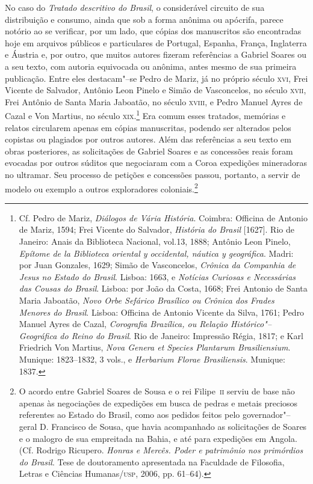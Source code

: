 \documentclass[12pt]{extarticle}
\begin{document}
{No caso do \textit{Tratado descritivo do Brasil}, o considerável
circuito de sua distribuição e consumo, ainda que sob a forma anônima
ou apócrifa, parece notório ao se verificar, por um lado, que cópias
dos manuscritos são encontradas hoje em arquivos públicos e
particulares de Portugal, Espanha, França, Inglaterra e Áustria e, por
outro, que muitos autores fizeram referências a Gabriel Soares ou a seu
texto, com autoria equivocada ou anônima, antes mesmo de sua primeira
publicação. Entre eles destacam"--se Pedro de Mariz, já no próprio século
\textsc{xvi}, Frei Vicente de Salvador, Antônio Leon Pinelo e Simão de
Vasconcelos, no século \textsc{xvii}, Frei Antônio de Santa Maria Jaboatão, no
século \textsc{xviii}, e Pedro Manuel Ayres de Cazal e Von Martius, no século
\textsc{xix}.\footnote{ Cf. Pedro de Mariz, \textit{Diálogos de Vária História}.
Coimbra: Officina de Antonio de Mariz, 1594; Frei Vicente do
Salvador,\textit{ História do Brasil} [1627]. Rio de Janeiro: Anais da
Biblioteca Nacional, vol.13, 1888; Antônio Leon Pinelo, \textit{Epítome
de la Biblioteca oriental y occidental, náutica y geográfica}. Madri:
por Juan Gonzales, 1629;  Simão de Vasconcelos, \textit{Crônica
da Companhia de Jesus no Estado do Brasil}. Lisboa: 1663, e
\textit{Notícias Curiosas e Necessárias das Cousas do Brasil}. Lisboa:
por João da Costa, 1668; Frei Antonio de Santa Maria Jaboatão,
\textit{Novo Orbe Sefárico Brasílico ou Crônica dos Frades Menores do
Brasil}. Lisboa: Officina de Antonio Vicente da Silva, 1761; 
Pedro Manuel Ayres de Cazal, \textit{Corografia Brazílica, ou Relação
Histórico"--Geográfica do Reino do Brasil}. Rio de Janeiro: Impressão
Régia, 1817; e Karl Friedrich Von Martius,
\textit{Nova Genera et Species Plantarum
Brasiliensium}. Munique: 1823--1832, 3 vols., e \textit{Herbarium
Florae Brasiliensis}. Munique: 1837.} Era comum esses tratados,
memórias e relatos circularem apenas em cópias manuscritas, podendo ser
alterados pelos copistas ou plagiados por outros autores. Além das
referências a seu texto em obras posteriores, as solicitações de
Gabriel Soares e as concessões reais foram evocadas por outros súditos
que negociaram com a Coroa expedições mineradoras no ultramar. Seu
processo de petições e concessões passou, portanto, a servir de modelo
ou exemplo a outros exploradores coloniais.\footnote{ O acordo entre
Gabriel Soares de Sousa e o rei Filipe~\textsc{ii} serviu de base não apenas
às negociações de expedições em busca de pedras e metais preciosos
referentes ao Estado do Brasil, como aos pedidos feitos pelo 
governador"--geral D. Francisco de Sousa, que havia acompanhado as
solicitações de Soares e o malogro de sua empreitada na Bahia, e até
para expedições em Angola. (Cf. Rodrigo Ricupero. \textit{Honras e Mercês.
Poder e patrimônio nos primórdios do Brasil}. Tese de doutoramento apresentada
na Faculdade de Filosofia, Letras e Ciências Humanas/\textsc{usp}, 2006, pp. 61--64).}

}
\end{document}
